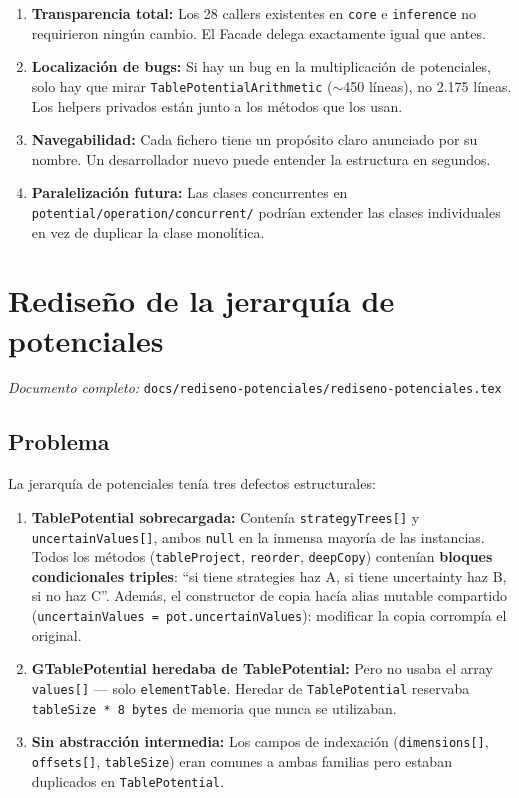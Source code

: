 \documentclass[11pt,a4paper]{article}
\begin{document}
\begin{enumerate}
  \item \textbf{Transparencia total:} Los 28 callers existentes en \texttt{core} e \texttt{inference} no requirieron ningún cambio. El Facade delega exactamente igual que antes.
  \item \textbf{Localización de bugs:} Si hay un bug en la multiplicación de potenciales, solo hay que mirar \texttt{TablePotentialArithmetic} ($\sim$450 líneas), no 2.175 líneas. Los helpers privados están junto a los métodos que los usan.
  \item \textbf{Navegabilidad:} Cada fichero tiene un propósito claro anunciado por su nombre. Un desarrollador nuevo puede entender la estructura en segundos.
  \item \textbf{Paralelización futura:} Las clases concurrentes en \texttt{potential/operation/concurrent/} podrían extender las clases individuales en vez de duplicar la clase monolítica.
\end{enumerate}

\section{Rediseño de la jerarquía de potenciales}
\label{sec:potenciales}

\noindent\textit{Documento completo:} \texttt{docs/rediseno-potenciales/rediseno-potenciales.tex}

\subsection{Problema}

La jerarquía de potenciales tenía tres defectos estructurales:

\begin{enumerate}
  \item \textcolor{problem}{\textbf{TablePotential sobrecargada:}} Contenía \texttt{strategyTrees[]} y \texttt{uncertainValues[]}, ambos \texttt{null} en la inmensa mayoría de las instancias. Todos los métodos (\texttt{tableProject}, \texttt{reorder}, \texttt{deepCopy}) contenían \textbf{bloques condicionales triples}: ``si tiene strategies haz A, si tiene uncertainty haz B, si no haz C''. Además, el constructor de copia hacía alias mutable compartido (\texttt{uncertainValues = pot.uncertainValues}): modificar la copia corrompía el original.
  \item \textcolor{problem}{\textbf{GTablePotential heredaba de TablePotential:}} Pero no usaba el array \texttt{values[]} --- solo \texttt{elementTable}. Heredar de \texttt{TablePotential} reservaba \texttt{tableSize * 8 bytes} de memoria que nunca se utilizaban.
  \item \textcolor{problem}{\textbf{Sin abstracción intermedia:}} Los campos de indexación (\texttt{dimensions[]}, \texttt{offsets[]}, \texttt{tableSize}) eran comunes a ambas familias pero estaban duplicados en \texttt{TablePotential}.
\end{enumerate}
\end{document}
